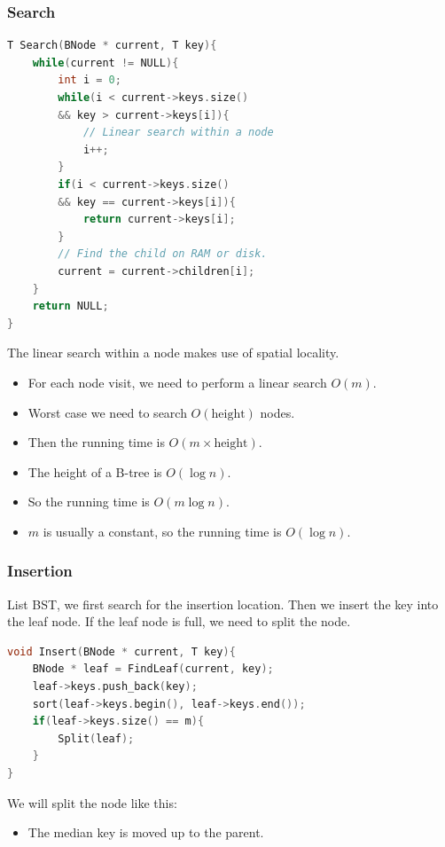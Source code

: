 \documentclass[letterpaper,12pt]{article}
\begin{document}
\subsubsection{Search}
\begin{algorithmic}
\end{algorithmic}
\begin{lstlisting}[language=C++]
T Search(BNode * current, T key){
    while(current != NULL){
        int i = 0;
        while(i < current->keys.size() 
        && key > current->keys[i]){
            // Linear search within a node
            i++;
        }
        if(i < current->keys.size() 
        && key == current->keys[i]){
            return current->keys[i];
        }
        // Find the child on RAM or disk.
        current = current->children[i];
    }
    return NULL;
}
\end{lstlisting}
The linear search within a node makes use of spatial locality. 

\begin{itemize}
    \item For each node visit, we need to perform a linear search $O(m)$.
    \item Worst case we need to search $O(\text{height})$ nodes.
    \item Then the running time is $O(m\times \text{height})$.
    \item The height of a B-tree is $O(\log n)$.
    \item So the running time is $O(m\log n)$.
    \item $m$ is usually a constant, so the running time is $O(\log n)$.
\end{itemize}
\subsubsection{Insertion}
List BST, we first search for the insertion location. Then we insert the key into the leaf node. If the leaf node is full, we need to split the node.
\begin{lstlisting}[language=C++]
void Insert(BNode * current, T key){
    BNode * leaf = FindLeaf(current, key);
    leaf->keys.push_back(key);
    sort(leaf->keys.begin(), leaf->keys.end());
    if(leaf->keys.size() == m){
        Split(leaf);
    }
}
\end{lstlisting}
We will split the node like this:\begin{itemize}
    \item The median key is moved up to the parent.
\end{itemize}
\end{document}
